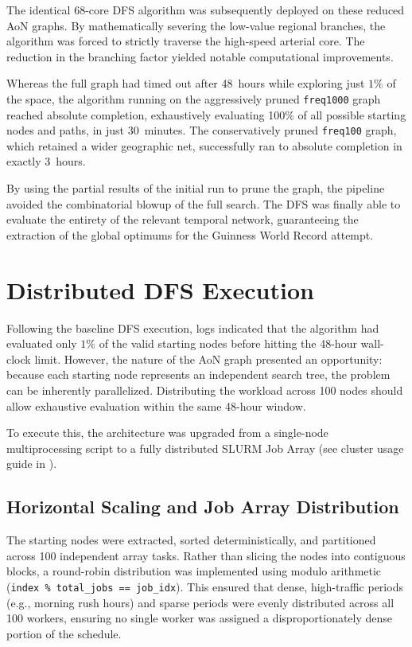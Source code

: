 The identical 68-core DFS algorithm was subsequently deployed on these reduced AoN graphs. By mathematically severing the low-value regional branches, the algorithm was forced to strictly traverse the high-speed arterial core. The reduction in the branching factor yielded notable computational improvements.

\medskip

Whereas the full graph had timed out after 48~hours while exploring just $1\%$ of the space, the algorithm running on the aggressively pruned \texttt{freq1000} graph reached absolute completion, exhaustively evaluating 100\% of all possible starting nodes and paths, in just 30~minutes. The conservatively pruned \texttt{freq100} graph, which retained a wider geographic net, successfully ran to absolute completion in exactly 3~hours.

\medskip

By using the partial results of the initial run to prune the graph, the pipeline avoided the combinatorial blowup of the full search. The DFS was finally able to evaluate the entirety of the relevant temporal network, guaranteeing the extraction of the global optimums for the Guinness World Record attempt.

\section{Distributed DFS Execution}
\label{sec:distributed_dfs}

Following the baseline DFS execution, logs indicated that the algorithm had evaluated only $1\%$ of the valid starting nodes before hitting the 48-hour wall-clock limit. However, the nature of the AoN graph presented an opportunity: because each starting node represents an independent search tree, the problem can be inherently parallelized. Distributing the workload across 100 nodes should allow exhaustive evaluation within the same 48-hour window.

\medskip

To execute this, the architecture was upgraded from a single-node multiprocessing script to a fully distributed SLURM Job Array (see cluster usage guide in \cite{csuc_hpc}).

\subsection{Horizontal Scaling and Job Array Distribution}
\label{subsec:job_array_distribution}

The starting nodes were extracted, sorted deterministically, and partitioned across 100 independent array tasks. Rather than slicing the nodes into contiguous blocks, a round-robin distribution was implemented using modulo arithmetic (\texttt{index \% total\_jobs == job\_idx}). This ensured that dense, high-traffic periods (e.g., morning rush hours) and sparse periods were evenly distributed across all 100 workers, ensuring no single worker was assigned a disproportionately dense portion of the schedule.


